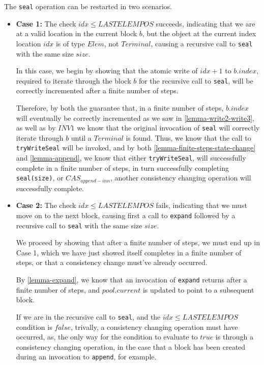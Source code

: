\begin{prooftwo}
The \verb=seal= operation can be restarted in two scenarios.

\begin{itemize}

\item \textbf{Case 1:} The check $idx \leq LASTELEMPOS$ succeeds, indicating
that we are at a valid location in the current block $b$, but the object at
the current index location $idx$ is of type $Elem$, not $Terminal$, causing a
recursive call to \verb=seal= with the same size $size$.

In this case, we begin by showing that the atomic write of $idx+1$ to
$b.index$, required to iterate through the block $b$ for the recursive call to
\verb=seal=, will be correctly incremented after a finite number of steps.

Therefore, by both the guarantee that, in a finite number of steps, $b.index$
will eventually be correctly incremented as we saw in
\ref{lemma-write2-write3}, as well as by $INV1$ we know that the original invocation of
\verb=seal= will correctly iterate through $b$ until a $Terminal$ is found.
Thus, we know that the call to \verb=tryWriteSeal= will be invoked, and by
both \ref{lemma-finite-steps-state-change} and \ref{lemma-append},
we know that either \verb=tryWriteSeal=, will successfully complete in a
finite number of steps, in turn successfully completing \verb=seal(size)=, or
$CAS_{append-inn}$, another consistency changing operation will successfully
complete.

\item \textbf{Case 2:} The check $idx \leq LASTELEMPOS$ fails, indicating that
we must move on to the next block, causing first a call to \verb=expand=
followed by a recursive call to \verb=seal= with the same size $size$.

We proceed by showing that after a finite number of steps, we must end up in
Case 1, which we have just showed itself completes in a finite number of
steps, or that a consistency change must've already occurred.

By \ref{lemma-expand}, we know that an invocation of \verb=expand=
returns after a finite number of steps, and $pool.current$ is updated to point
to a subsequent block.

If we are in the recursive call to \verb=seal=, and the $idx \leq LASTELEMPOS$
condition is $false$, trivally, a consistency changing operation must have
occurred, as, the only way for the condition to evaluate to $true$ is through
a consistency changing operation, in the case that a block has been created
during an invocation to \verb=append=, for example.


\end{itemize}
\end{prooftwo}
